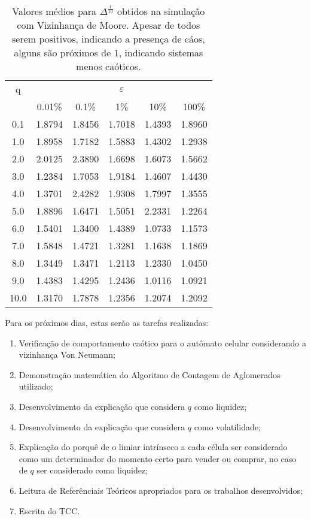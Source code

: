 \documentclass[12pt,a4paper,final]{article}
\begin{document}
 \begin{table}[h]
  \centering
  \begin{tabular}{c ccccc}
    \toprule
    q & \multicolumn{5}{c}{$\varepsilon$}\\
     & 0.01\% & 0.1\% & 1\% & 10\% & 100\%\\\midrule
    0.1 & 1.8794	& 1.8456	& 1.7018	& 1.4393	& 1.8960\\
    1.0 & 1.8958	& 1.7182	& 1.5883	& 1.4302	& 1.2938\\
    2.0 & 2.0125	& 2.3890	& 1.6698	& 1.6073	& 1.5662\\
    3.0 & 1.2384	& 1.7053	& 1.9184	& 1.4607	& 1.4430\\
    4.0 & 1.3701	& 2.4282	& 1.9308	& 1.7997	& 1.3555\\
    5.0 & 1.8896	& 1.6471	& 1.5051	& 2.2331	& 1.2264\\
    6.0 & 1.5401	& 1.3400	& 1.4389	& 1.0733	& 1.1573\\
    7.0 & 1.5848	& 1.4721	& 1.3281	& 1.1638	& 1.1869\\
    8.0 & 1.3449	& 1.3471	& 1.2113	& 1.2330	& 1.0450\\
    9.0 & 1.4383	& 1.4295	& 1.2436	& 1.0116	& 1.0921\\
    10.0& 1.3170	& 1.7878	& 1.2356	& 1.2074	& 1.2092\\\bottomrule
  \end{tabular}
  \caption{Valores médios para $\Delta^\frac{1}{10}$ obtidos na simulação com Vizinhança de Moore. Apesar de todos serem positivos, indicando a presença de cáos, alguns são próximos de $1$, indicando sistemas menos caóticos.}
  \label{tab:mediaDelta}
 \end{table}

  Para os próximos dias, estas serão as tarefas realizadas:
  \begin{enumerate}
    \item Verificação de comportamento caótico para o autômato celular considerando a vizinhança Von Neumann;
    \item Demonstração matemática do Algoritmo de Contagem de Aglomerados utilizado;
    \item Desenvolvimento da explicação que considera $q$ como liquidez;
    \item Desenvolvimento da explicação que considera $q$ como volatilidade;
    \item Explicação do porquê de o limiar intrínseco a cada célula ser considerado como um determinador do momento certo para vender ou comprar, no caso de $q$ ser considerado como liquidez;
    \item Leitura de Referênciais Teóricos apropriados para os trabalhos desenvolvidos;
    \item Escrita do TCC.
	\end{enumerate}
\end{document}
